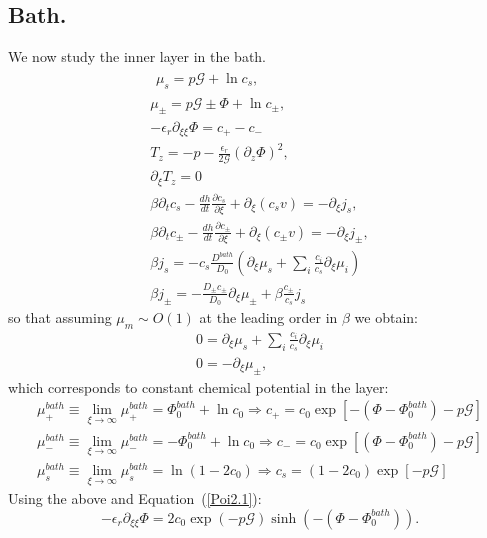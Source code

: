 \documentclass[12pt]{extarticle}
\begin{document}
\subsection{Bath.}
We now study the inner layer  in the bath.
\begin{gather}
\begin{aligned}
\mu_s = p \mathcal{G} + \ln c_s, 
\end{aligned}\\[2.5mm]
\mu_\pm = p \mathcal{G} \pm \Phi + \ln c_\pm ,\\
-\epsilon_r\partial_{\xi\xi} \Phi = c_+-c_-\, \label{Poi2.1}\\
T_z= -p-\frac{\epsilon_r }{2\mathcal{G}} (\partial_z \Phi)^2,\\
\partial_\xi T_z=0\\
\beta \partial_t c_s -\frac{dh}{dt}\frac{\partial c_s}{\partial \xi}+\partial_\xi(c_s v)= -\partial_\xi j_s,\\
\beta \partial_t c_\pm -\frac{dh}{dt}\frac{\partial c_\pm}{\partial \xi}+\partial_\xi(c_\pm v)= -\partial_\xi j_\pm,\\
\beta j_s =-c_s\frac{D^{bath}}{D_0}  \left(\partial_\xi\mu_s +\sum_i \frac{c_i}{c_s} \partial_\xi \mu_i\right)\\
\beta j_\pm= - \frac{D_\pm c_\pm}{D_0}\partial_\xi \mu_\pm+\beta\frac{c_\pm}{c_s}j_s
\end{gather}
so that assuming $\mu_m\sim O(1)$ at the leading order in $\beta$ we obtain:
\begin{gather}
0= \partial_\xi\mu_s +\sum_i \frac{c_i}{c_s} \partial_\xi \mu_i\\
0= - \partial_\xi \mu_\pm ,
\end{gather}
which corresponds to constant chemical potential in the layer:
\begin{gather}
\mu^{bath}_+\equiv \lim_{\xi\rightarrow \infty}\mu^{bath}_+= \Phi_0^{bath}+\ln c_0 \Rightarrow c_+ = c_0\exp[-(\Phi-\Phi_0^{bath})-p\mathcal{G}]\\
\mu^{bath}_-\equiv \lim_{\xi\rightarrow \infty}\mu^{bath}_-= -\Phi_0^{bath}+\ln c_0\Rightarrow c_- = c_0\exp[(\Phi-\Phi_0^{bath})-p\mathcal{G}]\\
\mu^{bath}_s\equiv \lim_{\xi\rightarrow \infty}\mu^{bath}_s= \ln (1-2c_0) \Rightarrow c_s = (1-2c_0)\exp[-p\mathcal{G}]
\end{gather}
Using the above and Equation~(\ref{Poi2.1}):
\begin{equation}
-\epsilon_r\partial_{\xi\xi} \Phi = 2c_0\exp(-p\mathcal{G}) \sinh(-(\Phi-\Phi_0^{bath})).
\end{equation}
\end{document}
